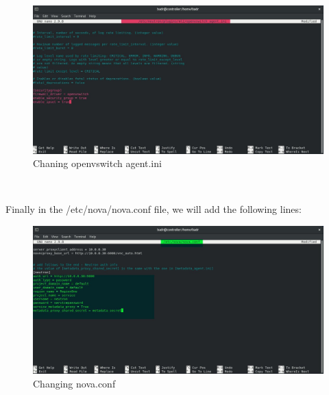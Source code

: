 \begin{spacing}{1.2}
\begin{figure}[!htb] 
\begin{center} 
\includegraphics[width=1\linewidth]{Cloud/Installing and Configuring Neutron services/Chaning openvswitch_agent.ini} 
\end{center} 
\caption{Chaning openvswitch agent.ini} 
\end{figure} 
\FloatBarrier
\\
\par Finally in the /etc/nova/nova.conf file, we will add the following lines:
\\
\begin{figure}[!htb] 
\begin{center} 
\includegraphics[width=1\linewidth]{Cloud/Installing and Configuring Neutron services/Changing nova.conf} 
\end{center} 
\caption{Changing nova.conf} 
\end{figure} 
\FloatBarrier
\\


\end{spacing}
